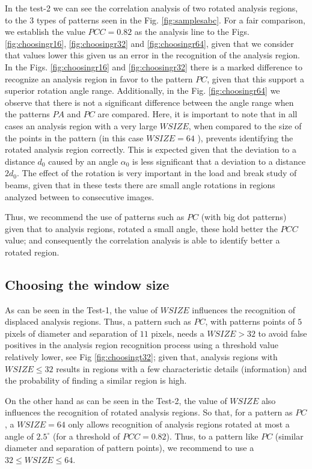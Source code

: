 In the test-2 we can see the correlation analysis of two rotated analysis regions, 
to the 3 types of patterns seen in the Fig. \ref{fig:samplesabc}.
For a fair comparison, we establish the value $PCC=0.82$ as the analysis line to the
Figs. \ref{fig:choosingr16}, \ref{fig:choosingr32} and \ref{fig:choosingr64}, 
given that we consider that
values lower this given us an error in the recognition of the analysis region.
In the Figs.  \ref{fig:choosingr16} and \ref{fig:choosingr32} there is
a marked difference  to recognize an analysis region in favor to the
pattern $PC$, given that this support a superior rotation angle range. Additionally,
in the Fig. \ref{fig:choosingr64} we observe that there is not a 
significant difference between the angle range  when the patterns
$PA$ and $PC$ are compared.
Here, it is important  to note
that in all cases an analysis region with a very large $WSIZE$,
 when compared to the size of the points in the pattern
 (in this case $WSIZE=64$ ), prevents identifying the rotated analysis region correctly.
 This is expected given that 
the deviation to a distance $d_0$ caused by an angle $\alpha_0$ is less significant that
a deviation to a distance $2d_0$. The effect of the rotation is very important 
in the  load and break study of beams, given that in these tests
there are small angle rotations in regions analyzed between to consecutive images.

Thus, we recommend the use of patterns such as $PC$ (with big dot patterns) 
given that to analysis regions, rotated a small angle,
these hold better the $PCC$ value; and consequently the correlation analysis 
is able to identify better a rotated region. 

\subsection{Choosing the window size}

As can be seen in the Test-1, the value of $WSIZE$
influences the recognition of displaced analysis regions.
Thus, a pattern such as $PC$, with patterns points of 
$5$ pixels of diameter and separation of $11$ pixels,
needs  a $WSIZE > 32$ to avoid false positives in the 
analysis region recognition process using a threshold value relatively 
lower, see Fig \ref{fig:choosingt32};
given that, analysis regions with $WSIZE \leq 32$ results in regions with a few
characteristic details (information) and the probability of
finding a similar region is high.

On the other hand as can be seen in the Test-2, the value of $WSIZE$
also influences the recognition of rotated analysis regions.
So that, for a pattern as $PC$, a $WSIZE=64$ only allows
recognition of analysis regions rotated at most a angle of $2.5^\circ$
(for a threshold of $PCC=0.82$). 
Thus, to a pattern like $PC$ (similar diameter and separation of pattern points), 
we recommend to use  a $32 \leq WSIZE \leq 64$.



